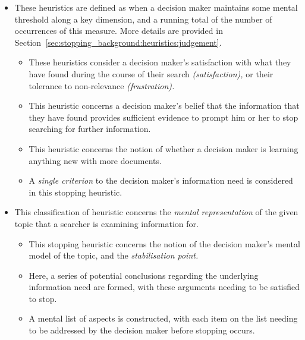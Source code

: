 \begin{itemize}
    \item{ These heuristics are defined as when a decision maker maintains some mental threshold along a key dimension, and a running total of the number of occurrences of this measure. More details are provided in Section~\ref{sec:stopping_background:heuristics:judgement}.}
    \begin{itemize}
        \item{ These heuristics consider a decision maker's satisfaction with what they have found during the course of their search \emph{(satisfaction),} or their tolerance to non-relevance \emph{(frustration).}}
        \item{ This heuristic concerns a decision maker's belief that the information that they have found provides sufficient evidence to prompt him or her to stop searching for further information.}
        \item{ This heuristic concerns the notion of whether a decision maker is learning anything new with more documents.}
        \item{ A \emph{single criterion} to the decision maker's information need is considered in this stopping heuristic.}
    \end{itemize}
    
    \item{ This classification of heuristic concerns the \emph{mental representation} of the given topic that a searcher is examining information for.}
    \begin{itemize}
        \item{ This stopping heuristic concerns the notion of the decision maker's mental model of the topic, and the \emph{stabilisation point.}}
        \item{ Here, a series of potential conclusions regarding the underlying information need are formed, with these arguments needing to be satisfied to stop.}
        \item{ A mental list of aspects is constructed, with each item on the list needing to be addressed by the decision maker before stopping occurs.}
    \end{itemize}
\end{itemize}

